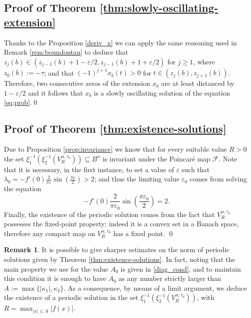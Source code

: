 \documentclass[a4paper,11pt]{article}
\theoremstyle{plain}
\theoremstyle{definition}
\newtheorem{remark}[thm]{Remark}
\theoremstyle{definition}
\newcommand{\Fcal}{\mathcal{F}}
\numberwithin{equation}{section}
\begin{document}
\subsection{Proof of Theorem \ref{thm:slowly-oscillating-extension}}

Thanks to the Proposition \ref{deriv_x} we can apply the same reasoning used in Remark \ref{rem:boundontau} to deduce that $z_j(b)\in (z_{j-1}(b) + 1 -\varepsilon/2, z_{j-1}(b) + 1 + \varepsilon/2)$ for $j\geq1$, where $z_0(b) := -\tau$; and that $(-1)^{j+1} x_b(t)>0$ for $t\in(z_j(b) , z_{j+1}(b))$. Therefore, two consecutive zeros of the extension $x_b$ are at least distanced by $1-\varepsilon/2$ and it follows that $x_b$ is a slowly oscillating solution of the equation \ref{eq:prob}.\qed

\subsection{Proof of Theorem \ref{thm:existence-solutions}}

Due to Proposition \ref{prop:invariance} we know that for every suitable value $R>0$ the set $\xi_1^{-1}(\xi_2^{-1}(V^{\alpha, \tau_0}_R)) \subseteq B^\alpha$ is invariant under the Poincaré map $\Fcal$. Note that it is necessary, in the first instance, to set a value of $\varepsilon$ such that $\lambda_0 = -f'(0) \frac{2}{\pi\varepsilon} \sin\left( \frac{\pi\varepsilon}{2} \right) >2$; and thus the limiting value $\varepsilon_0$ comes from solving the equation
\[
    -f'(0)\frac{2}{\pi\varepsilon_0} \sin\left( \frac{\pi\varepsilon_0}{2} \right) = 2.
\]
Finally, the existence of the periodic solution comes from the fact that $V^{\alpha,\tau_0}_R$ possesses the fixed-point property: indeed it is a convex set in a Banach space, therefore any compact map on $V^{\alpha,\tau_0}_R$ has a fixed point. \qed

\begin{remark}
It is possible to give sharper estimates on the norm of periodic solutions given by Theorem \ref{thm:existence-solutions}. In fact, noting that the main property we use for the value $A_0$ is given in \eqref{diag_cond}, and to maintain this condition it is enough to have $A_0$ as any number strictly larger than $A := \max\{ |\kappa_1|,\kappa_2 \}$. As a consequence, by means of a limit argument, we deduce the existence of a periodic solution in the set $\xi_1^{-1}(\xi_2^{-1}(V^{\alpha,\tau_0}_R))$, with $R = \max_{|x|\leq A} |f(x)|$.
\end{remark}
\end{document}
